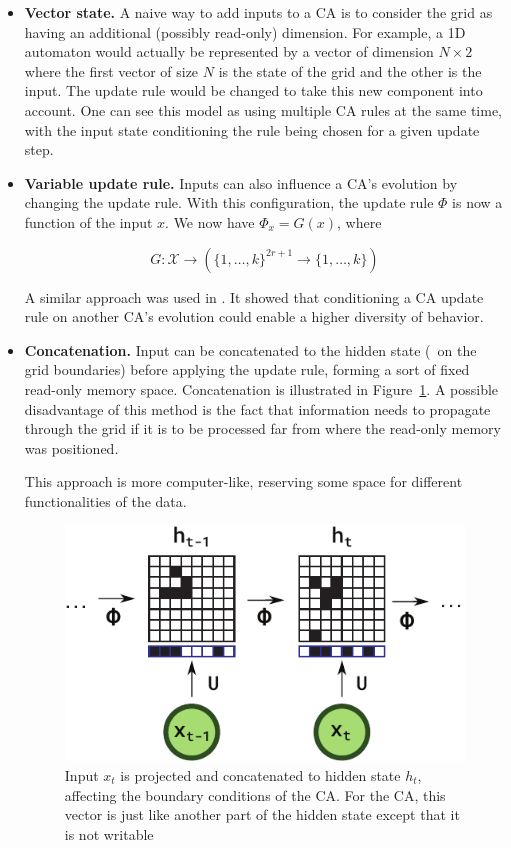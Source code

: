 \begin{itemize}
  \item \textbf{Vector state.} A naive way to add inputs to a \ac{CA} is to
        consider the grid as having an additional (possibly read-only)
        dimension. For example, a 1D automaton would actually be represented by
        a vector of dimension $N\times 2$ where the first vector of size $N$ is the
        state of the grid and the other is the input. The update rule would be
        changed to take this new component into account. One can see this model
        as using multiple CA rules at the same time, with the input state
        conditioning the rule being chosen for a given update step.

  \item \textbf{Variable update rule.} Inputs can also influence a CA's evolution by
        changing the update rule. With this configuration, the update rule $\Phi$
        is now a function of the input $x$. We now have $\Phi_x = G(x)$, where

        \[G: \mathcal{X} \rightarrow \left({\{ 1, \ldots, k \}}^{2r+1} \to \{1, \ldots, k\}\right)\]


        A similar approach was used in
        \parencite{adamsFormalDefinitionsUnbounded2017}. It showed that
        conditioning a CA update rule on another CA's evolution could enable a
        higher diversity of behavior.

  \item \textbf{Concatenation.} Input can be concatenated to the hidden state (\eg~on
        the grid boundaries) before applying the update rule, forming a sort of
        fixed read-only memory space. Concatenation is illustrated in
        Figure~\ref{fig:concat}. A possible disadvantage of this method is the
        fact that information needs to propagate through the grid if it is to be
        processed far from where the read-only memory was positioned.

        This approach is more computer-like, reserving some space for different
        functionalities of the data.

\begin{figure}[ht]
  \centering \includegraphics[width=.5\linewidth]{figures/concat.pdf}
  \caption{\label{fig:concat} Input $x_t$ is projected and concatenated to
    hidden state $h_t$, affecting the boundary conditions of the 
    \ac{CA}. For the \ac{CA}, this vector is just like another part of the
    hidden state except that it is not writable}
\end{figure}
\end{itemize}


